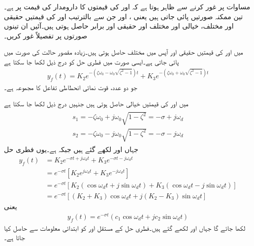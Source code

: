 مساوات  پر غور کرنے سے ظاہر ہوتا ہے کہ  اور  کی قیمتوں کا دارومدار  کی قیمت پر ہے۔تین ممکنہ صورتیں پائی جاتی ہیں یعنی ،  اور  جن سے بالترتیب  اور  کی قیمتیں حقیقی اور مختلف، خیالی اور مختلف اور حقیقی اور برابر حاصل ہوتی ہیں۔آئیں ان تینوں صورتوں پر تفصیلاً غور کریں۔

 میں  اور  کی قیمتیں حقیقی اور آپس میں مختلف حاصل ہوتی ہیں۔زیادہ مقصور حالت  کی صورت میں پائی جاتی ہے۔ایسی صورت میں فطری حل کو درج ذیل لکھا جا سکتا ہے
\begin{align}
y_f(t)=K_2 e^{-(\zeta\omega_0- \omega_0\sqrt{\zeta^2-1})t}+K_3 e^{-(\zeta\omega_0+ \omega_0\sqrt{\zeta^2-1})t}
\end{align}
جو دو عدد، قوت نمائی انحطاطی تفاعل  کا مجموعہ ہے۔

   میں  اور  کی قیمتیں خیالی حاصل ہوتی ہیں جنہیں درج ذیل لکھا جا سکتا ہے
\begin{gather}
\begin{aligned}
s_1=-\zeta\omega_0+ j\omega_0\sqrt{1-\zeta^2}=-\sigma+j \omega_d\\
s_2=-\zeta\omega_0- j\omega_0\sqrt{1-\zeta^2}=-\sigma-j\omega_d
\end{aligned}
\end{gather}
جہاں  اور  لکھے گئے ہیں جبکہ  ہے۔یوں فطری حل
\begin{align*}
y_f(t)&=K_2e^{-\sigma t+j\omega_d t}+K_3e^{-\sigma t -j \omega_d t}\\
&=e^{-\sigma t} \left[K_2 e^{j \omega_d t}+K_3 e^{-j \omega_d t}\right]\\
&=e^{-\sigma t} \left[K_2(\cos \omega_d t + j \sin \omega_d t)+K_3(\cos \omega_d t -j \sin \omega_d t)\right]\\
&=e^{-\sigma t} \left[(K_2+K_3)\cos \omega_d t+j(K_2-K_3)\sin \omega_d t\right]
\end{align*}
یعنی
\begin{align}\label{مساوات_عارضی_فطری_حل_کم_تقصیر_الف}
y_f(t)=e^{-\sigma t} \left(c_1 \cos \omega_d t +j c_2 \sin \omega_d t\right)
\end{align}
لکھا جائے گا جہاں  اور  لکھے گئے ہیں۔فطری حل کے مستقل  اور  کو ابتدائی معلومات سے حاصل کیا جاتا ہے۔

